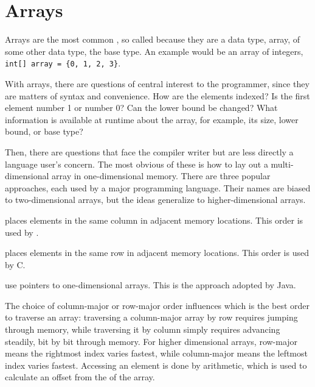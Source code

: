 \section{Arrays}
Arrays are the most common , so called because they are a data type, array, of some other data type, the base type. An example would be an array of integers, \lstinline|int[] array = {0, 1, 2, 3}|.

With arrays, there are questions of central interest to the programmer, since they are matters of syntax and convenience. How are the elements indexed? Is the first element number 1 or number 0? Can the lower bound be changed? What information is available at runtime about the array, for example, its size, lower bound, or base type?

Then, there are questions that face the compiler writer but are less directly a language user's concern. The most obvious of these is how to lay out a multi-dimensional array in one-dimensional memory. There are three popular approaches, each used by a major programming language. Their names are biased to two-dimensional arrays, but the ideas generalize to higher-dimensional arrays.

\begin{description}
\item{} places elements in the same column in adjacent memory locations. This order is used by \Fortran{}.

\item{} places elements in the same row in adjacent memory locations. This order is used by C.

\item{} use pointers to one-dimensional arrays. This is the approach adopted by Java.
\end{description}

The choice of column-major or row-major order influences which is the best order to traverse an array: traversing a column-major array by row requires jumping through memory, while traversing it by column simply requires advancing steadily, bit by bit through memory. For higher dimensional arrays, row-major means the rightmost index varies fastest, while column-major means the leftmost index varies fastest. Accessing an element is done by arithmetic, which is used to calculate an offset from the  of the array.

